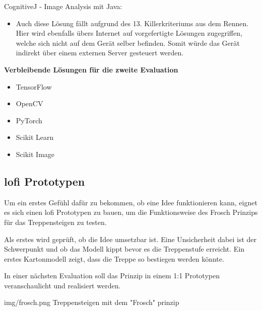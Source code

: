 CognitiveJ - Image Analysis mit Java:
\begin{itemize}
    \item Auch diese Lösung fällt aufgrund des 13. Killerkriteriums aus dem Rennen. Hier wird ebenfalls übers Internet auf vorgefertigte Lösungen zugegriffen, welche sich nicht auf dem Gerät selber befinden. Somit würde das Gerät indirekt über einem externen Server gesteuert werden.
\end{itemize}

\textbf{Verbleibende Lösungen für die zweite Evaluation}
\begin{itemize}
    \item TensorFlow 
    \item OpenCV
    \item PyTorch
    \item Scikit Learn
    \item Scikit Image
\end{itemize}

\subsection{\acrshort{lofi} Prototypen}

Um ein erstes Gefühl dafür zu bekommen, ob eine Idee funktionieren kann, eignet es 
sich einen \acrfull{lofi} Prototypen zu bauen, um die Funktionsweise
des \glqq Frosch\grqq{} Prinzips für das Treppensteigen zu testen.

Als erstes wird geprüft, ob die Idee umsetzbar ist.
Eine Unsicherheit dabei ist der Schwerpunkt und ob das Modell kippt
bevor es die Treppenstufe erreicht. Ein erstes Kartonmodell zeigt,
dass die Treppe so bestiegen werden könnte.

In einer nächsten Evaluation soll das Prinzip in einem 1:1 Prototypen veranschaulicht und realisiert werden.

\image
 {img/frosch.png}
 {Treppensteigen mit dem "Frosch" prinzip}
